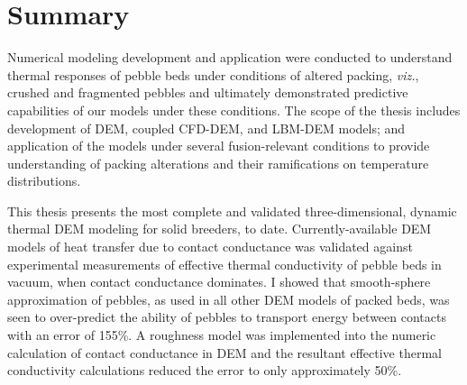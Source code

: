 \chapter{Summary}\label{sec:summary}

Numerical modeling development and application were conducted to understand thermal responses of pebble beds under conditions of altered packing, \textit{viz.}, crushed and fragmented pebbles and ultimately demonstrated predictive capabilities of our models under these conditions. The scope of the thesis includes development of DEM, coupled CFD-DEM, and LBM-DEM models; and application of the models under several fusion-relevant conditions to provide understanding of packing alterations and their ramifications on temperature distributions.


This thesis presents the most complete and validated three-dimensional, dynamic thermal DEM modeling for solid breeders, to date. Currently-available DEM models of heat transfer due to contact conductance was validated against experimental measurements of effective thermal conductivity of pebble beds in vacuum, when contact conductance dominates. I showed that smooth-sphere approximation of pebbles, as used in all other DEM models of packed beds, was seen to over-predict the ability of pebbles to transport energy between contacts with an error of 155\%. A roughness model was implemented into the numeric calculation of contact conductance in DEM and the resultant effective thermal conductivity calculations reduced the error to only approximately 50\%. 

